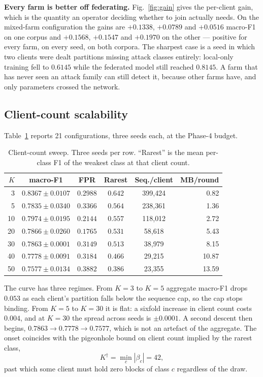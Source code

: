 \documentclass[conference]{IEEEtran}
\begin{document}
\textbf{Every farm is better off federating.} Fig.~\ref{fig:gain} gives the per-client gain, which
is the quantity an operator deciding whether to join actually needs. On the mixed-farm
configuration the gains are $+0.1338$, $+0.0789$ and $+0.0516$ macro-F1 on one corpus and
$+0.1568$, $+0.1547$ and $+0.1970$ on the other --- positive for every farm, on every seed, on
both corpora. The sharpest case is a seed in which two clients were dealt partitions missing
attack classes entirely: local-only training fell to $0.6145$ while the federated model still
reached $\mathbf{0.8145}$. A farm that has never seen an attack family can still detect it,
because other farms have, and only parameters crossed the network.

\subsection{Client-count scalability}\label{sec:ksweep}
Table~\ref{tab:ksweep} reports 21 configurations, three seeds each, at the Phase-4 budget.

\begin{table}[tbp]
\caption{Client-count sweep. Three seeds per row. ``Rarest'' is the mean per-class F1 of the
weakest class at that client count.}
\label{tab:ksweep}
\centering\small\setlength{\tabcolsep}{4pt}
\begin{tabular}{@{}rccccr@{}}
\toprule
$K$ & macro-F1 & FPR & Rarest & Seq./client & MB/round\\
\midrule
3  & $\mathbf{0.8367 \pm 0.0107}$ & $0.2988$ & $\mathbf{0.642}$ & 399{,}424 & 0.82\\
5  & $0.7835 \pm 0.0340$ & $0.3366$ & $0.564$ & 238{,}361 & 1.36\\
10 & $0.7974 \pm 0.0195$ & $0.2144$ & $0.557$ & 118{,}012 & 2.72\\
20 & $0.7866 \pm 0.0260$ & $0.1765$ & $0.531$ & 58{,}618  & 5.43\\
30 & $0.7863 \pm 0.0001$ & $0.3149$ & $0.513$ & 38{,}979  & 8.15\\
40 & $0.7778 \pm 0.0091$ & $0.3184$ & $0.466$ & 29{,}215  & 10.87\\
50 & $0.7577 \pm 0.0134$ & $\mathbf{0.3882}$ & $\mathbf{0.386}$ & 23{,}355 & 13.59\\
\bottomrule
\end{tabular}
\end{table}

The curve has three regimes. From $K=3$ to $K=5$ aggregate macro-F1 drops $0.053$ as each
client's partition falls below the sequence cap, so the cap stops binding. From $K=5$ to $K=30$
it is flat: a sixfold increase in client count costs $0.004$, and at $K=30$ the spread across
seeds is $\pm 0.0001$. A second descent then begins, $0.7863 \rightarrow 0.7778 \rightarrow
0.7577$, which is not an artefact of the aggregate. The onset coincides with the pigeonhole
bound on client count implied by the rarest class,
\begin{equation}
K^{\dagger} = \min_c |\beta_c| = 42,
\label{eq:pigeonhole}
\end{equation}
past which some client must hold zero blocks of class $c$ regardless of the draw.
\end{document}
